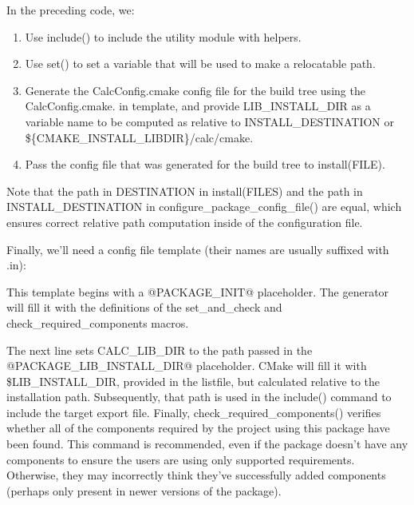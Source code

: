 In the preceding code, we:

\begin{enumerate}
\item
Use include() to include the utility module with helpers.

\item
Use set() to set a variable that will be used to make a relocatable path.

\item
Generate the CalcConfig.cmake config file for the build tree using the CalcConfig.cmake.
in template, and provide LIB\_INSTALL\_DIR as a variable name to be computed as relative to INSTALL\_DESTINATION or \$\{CMAKE\_INSTALL\_LIBDIR\}/calc/cmake.

\item
Pass the config file that was generated for the build tree to install(FILE).
\end{enumerate}

Note that the path in DESTINATION in install(FILES) and the path in INSTALL\_DESTINATION in configure\_package\_config\_file() are equal, which ensures correct relative path computation inside of the configuration file.

Finally, we’ll need a config file template (their names are usually suffixed with .in):



This template begins with a @PACKAGE\_INIT@ placeholder. The generator will fill it with the definitions of the set\_and\_check and check\_required\_components macros.

The next line sets CALC\_LIB\_DIR to the path passed in the @PACKAGE\_LIB\_INSTALL\_DIR@ placeholder. CMake will fill it with \$LIB\_INSTALL\_DIR, provided in the listfile, but calculated relative to the installation path. Subsequently, that path is used in the include() command to include the target export file. Finally, check\_required\_components() verifies whether all of the components required by the project using this package have been found. This command is recommended, even if the package doesn’t have any components to ensure the users are using only supported requirements. Otherwise, they may incorrectly think they’ve successfully added components (perhaps only present in newer versions of the package).

